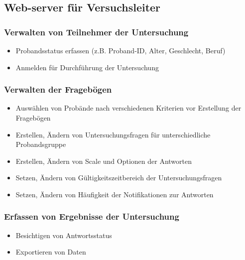 \documentclass[a4paper]{scrreprt}
\begin{document}
            \subsection{Web-server f\"ur Versuchsleiter}
                \vspace*{0.2cm}

                \subsubsection{Verwalten von Teilnehmer der Untersuchung}
                    \begin{itemize}
                        \item Probandsstatus erfassen (z.B. Proband-ID, Alter, Geschlecht, Beruf)
                        \item Anmelden f\"ur Durchf\"uhrung der Untersuchung
                    \end{itemize}

                \subsubsection{Verwalten der Frageb\"ogen}
                    \begin{itemize}
                        \item Ausw\"ahlen von Prob\"ande nach verschiedenen Kriterien vor Erstellung der Frageb\"ogen
                        \item Erstellen, \"Andern von Untersuchungsfragen f\"ur unterschiedliche Probandsgruppe
                        \item Erstellen, \"Andern von Scale und Optionen der Antworten
                        \item Setzen, \"Andern von G\"ultigkeitszeitbereich der Untersuchungsfragen
                        \item Setzen, \"Andern von H\"aufigkeit der Notifikationen zur Antworten
                    \end{itemize}

                \subsubsection{Erfassen von Ergebnisse der Untersuchung}
                    \begin{itemize}
                        \item Besichtigen von Antwortsstatus
                        \item Exportieren von Daten
                    \end{itemize}
            \vspace*{2cm}
\end{document}

